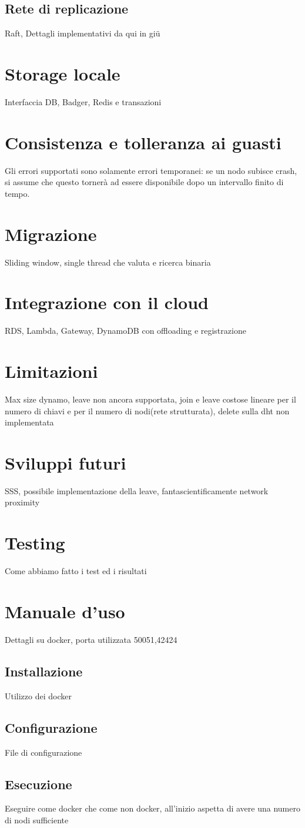 \documentclass[conference]{IEEEtran}
\begin{document}
\subsection{Rete di replicazione}
Raft, Dettagli implementativi da qui in giü
\section{Storage locale}
Interfaccia DB, Badger, Redis e transazioni
\section{Consistenza e tolleranza ai guasti}
Gli errori supportati sono solamente errori temporanei: se un nodo subisce crash, si assume che questo tornerà ad essere
disponibile dopo un intervallo finito di tempo.
\section{Migrazione}
Sliding window, single thread che valuta e ricerca binaria
\section{Integrazione con il cloud}
RDS, Lambda, Gateway, DynamoDB con offloading e registrazione
\section{Limitazioni}
Max size dynamo, leave non ancora supportata, join e leave costose lineare per il numero di chiavi e per il numero di nodi(rete strutturata),
delete sulla dht non implementata
\section{Sviluppi futuri}
SSS, possibile implementazione della leave, fantascientificamente network proximity
\section{Testing}
Come abbiamo fatto i test ed i risultati
\section{Manuale d'uso}
Dettagli su docker, porta utilizzata 50051,42424
\subsection{Installazione}
Utilizzo dei docker
\subsection{Configurazione}
File di configurazione
\subsection{Esecuzione}
Eseguire come docker che come non docker, all'inizio aspetta di avere una numero di nodi sufficiente


\printbibliography
\end{document}
